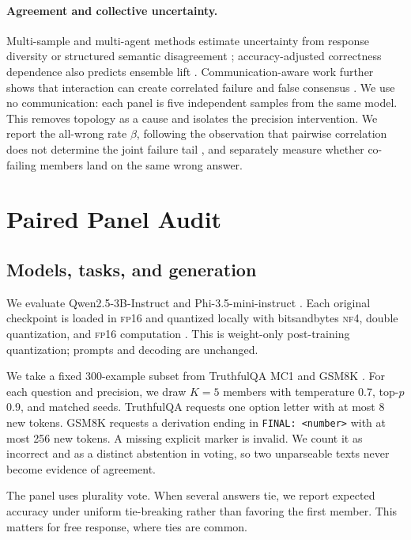 \documentclass[11pt]{article}
\newcommand{\nf}{\textsc{nf4}}
\newcommand{\fp}{\textsc{fp16}}
\begin{document}
\paragraph{Agreement and collective uncertainty.}
Multi-sample and multi-agent methods estimate uncertainty from response diversity or structured semantic disagreement \citep{feng-etal-2025-rethinking,kruse-etal-2025-muse,jiang2026discouq}; accuracy-adjusted correctness dependence also predicts ensemble lift \citep{ali2026diversity}. Communication-aware work further shows that interaction can create correlated failure and false consensus \citep{huang2026cagecal}. We use no communication: each panel is five independent samples from the same model. This removes topology as a cause and isolates the precision intervention. We report the all-wrong rate $\beta$, following the observation that pairwise correlation does not determine the joint failure tail \citep{chen2026cofailure}, and separately measure whether co-failing members land on the same wrong answer.

\section{Paired Panel Audit}

\subsection{Models, tasks, and generation}

We evaluate Qwen2.5-3B-Instruct \citep{qwen2024qwen25} and Phi-3.5-mini-instruct \citep{abdin2024phi3}. Each original checkpoint is loaded in \fp{} and quantized locally with bitsandbytes \nf{}, double quantization, and \fp{} computation \citep{dettmers2023qlora}. This is weight-only post-training quantization; prompts and decoding are unchanged.

We take a fixed 300-example subset from TruthfulQA MC1 \citep{lin-etal-2022-truthfulqa} and GSM8K \citep{cobbe2021gsm8k}. For each question and precision, we draw $K=5$ members with temperature 0.7, top-$p$ 0.9, and matched seeds. TruthfulQA requests one option letter with at most 8 new tokens. GSM8K requests a derivation ending in \texttt{FINAL: <number>} with at most 256 new tokens. A missing explicit marker is invalid. We count it as incorrect and as a distinct abstention in voting, so two unparseable texts never become evidence of agreement.

The panel uses plurality vote. When several answers tie, we report expected accuracy under uniform tie-breaking rather than favoring the first member. This matters for free response, where ties are common.
\end{document}
